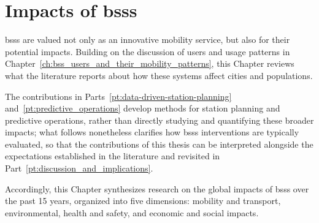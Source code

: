 \chapter[Impacts of BSSs]{Impacts of \acp{bss}}
\label{ch:impacts_of_bss}

\acp{bss} are valued not only as an innovative mobility service, but also for their potential impacts. Building on the discussion of users and usage patterns in Chapter~\ref{ch:bss_users_and_their_mobility_patterns}, this Chapter reviews what the literature reports about how these systems affect cities and populations.

The contributions in Parts~\ref{pt:data-driven-station-planning} and~\ref{pt:predictive_operations} develop methods for station planning and predictive operations, rather than directly studying and quantifying these broader impacts; what follows nonetheless clarifies how \acp{bss} interventions are typically evaluated, so that the contributions of this thesis can be interpreted alongside the expectations established in the literature and revisited in Part~\ref{pt:discussion_and_implications}.

Accordingly, this Chapter synthesizes research on the global impacts of \acp{bss} over the past 15 years, organized into five dimensions: mobility and transport, environmental, health and safety, and economic and social impacts.








 

    